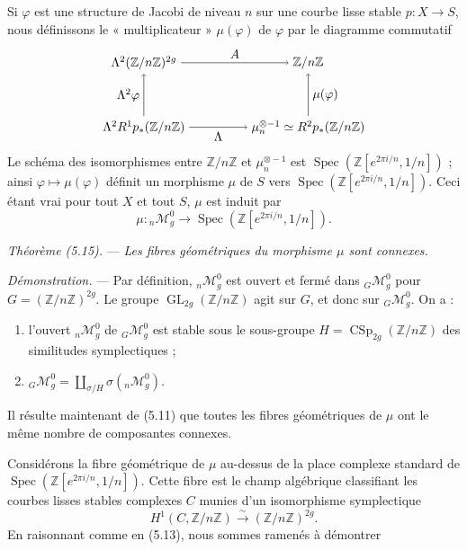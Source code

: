 \documentclass[10pt]{article}
\newcommand{\Spec}{\operatorname{Spec}}
\begin{document}
Si $\varphi$ est une structure de Jacobi de niveau $n$ sur une courbe lisse stable $p:X\to S$, nous définissons le « multiplicateur » $\mu(\varphi)$ de $\varphi$ par le diagramme commutatif
\[
\begin{tikzpicture}[baseline=(current bounding box.center)]
\node (A) at (0,1.8) {$\Lambda^2(\mathbb Z/n\mathbb Z)^{2g}$};
\node (B) at (4.6,1.8) {$\mathbb Z/n\mathbb Z$};
\node (C) at (0,0) {$\Lambda^2R^1p_*(\mathbb Z/n\mathbb Z)$};
\node (D) at (4.6,0) {$\mu_n^{\otimes -1}\simeq R^2p_*(\mathbb Z/n\mathbb Z)$};
\draw[->] (A) -- node[above] {$A$} (B);
\draw[->] (C) -- node[below] {$\Lambda$} (D);
\draw[->] (C) -- node[left] {$\Lambda^2\varphi$} (A);
\draw[->] (D) -- node[right] {$\mu(\varphi)$} (B);
\end{tikzpicture}
\]
Le schéma des isomorphismes entre $\mathbb Z/n\mathbb Z$ et $\mu_n^{\otimes -1}$ est $\Spec(\mathbb Z[e^{2\pi i/n},1/n])$ ; ainsi $\varphi\mapsto\mu(\varphi)$ définit un morphisme $\mu$ de $S$ vers $\Spec(\mathbb Z[e^{2\pi i/n},1/n])$. Ceci étant vrai pour tout $X$ et tout $S$, $\mu$ est induit par
\[
\mu:{}_n\mathcal M_g^0\longrightarrow \Spec(\mathbb Z[e^{2\pi i/n},1/n]).
\]

\medskip
\noindent\emph{Théorème (5.15).} --- \emph{Les fibres géométriques du morphisme $\mu$ sont connexes.}

\noindent\emph{Démonstration.} --- Par définition, ${}_n\mathcal M_g^0$ est ouvert et fermé dans ${}_G\mathcal M_g^0$ pour $G=(\mathbb Z/n\mathbb Z)^{2g}$. Le groupe $\operatorname{GL}_{2g}(\mathbb Z/n\mathbb Z)$ agit sur $G$, et donc sur ${}_G\mathcal M_g^0$. On a :
\begin{enumerate}[label=(\roman*)]
\item l'ouvert ${}_n\mathcal M_g^0$ de ${}_G\mathcal M_g^0$ est stable sous le sous-groupe $H=\operatorname{CSp}_{2g}(\mathbb Z/n\mathbb Z)$ des similitudes symplectiques ;
\item ${}_G\mathcal M_g^0=\coprod_{\sigma/H}\sigma({}_n\mathcal M_g^0)$.
\end{enumerate}

Il résulte maintenant de (5.11) que toutes les fibres géométriques de $\mu$ ont le même nombre de composantes connexes.

Considérons la fibre géométrique de $\mu$ au-dessus de la place complexe standard de $\Spec(\mathbb Z[e^{2\pi i/n},1/n])$. Cette fibre est le champ algébrique classifiant les courbes lisses stables complexes $C$ munies d'un isomorphisme symplectique
\[
H^1(C,\mathbb Z/n\mathbb Z)\xrightarrow{\sim}(\mathbb Z/n\mathbb Z)^{2g}.
\]
En raisonnant comme en (5.13), nous sommes ramenés à démontrer
\end{document}
